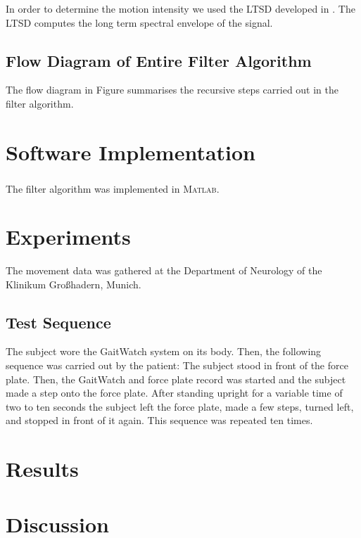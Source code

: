 In order to determine the motion intensity we used the \gls{LTSD} developed in \cite{olivares_vicente_gaitwatch_2013}. The \gls{LTSD} computes the long term spectral envelope of the signal.

\subsection{Flow Diagram of Entire Filter Algorithm}

The flow diagram in Figure summarises the recursive steps carried out in the filter algorithm.

\section{Software Implementation}

The filter algorithm was implemented in \textsc{Matlab}\textsuperscript{\textregistered}.

\section{Experiments}

The movement data was gathered at the Department of Neurology of the Klinikum Großhadern, Munich.

\subsection{Test Sequence}

The subject wore the GaitWatch system on its body. Then, the following sequence was carried out by the patient: The subject stood in front of the force plate. Then, the GaitWatch and force plate record was started and the subject made a step onto the force plate. After standing upright for a variable time of two to ten seconds the subject left the force plate, made a few steps, turned left, and stopped in front of it again. This sequence was repeated ten times.

\section{Results}

\section{Discussion}

